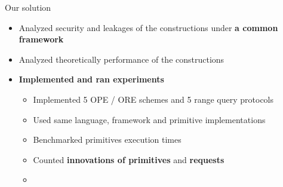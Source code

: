\begin{frame}[label={frame:ore}]
\begin{columns}[T,onlytextwidth]
{\begin{block}{Our solution}
						\begin{itemize}[leftmargin=*]
							\item Analyzed security and leakages of the constructions under \textbf{a common framework}
							\item Analyzed theoretically performance of the constructions
							\item \textbf{Implemented and ran experiments}
							\begin{itemize}[leftmargin=*]
								\item Implemented 5 OPE / ORE schemes and 5 range query protocols
								\item Used same language, framework and primitive implementations
								\item Benchmarked primitives execution times
								\item Counted \textbf{innovations of primitives} and \textbf{\IO{} requests}
								\item[]
									\hyperlink{frame:appendix:ore}{}
									\hyperlink{frame:appendix:protocols}{}
									\hyperlink{frame:appendix:plot}{}
							\end{itemize}
						\end{itemize}

					\end{block}
				}

		\end{columns}

	\end{frame}

